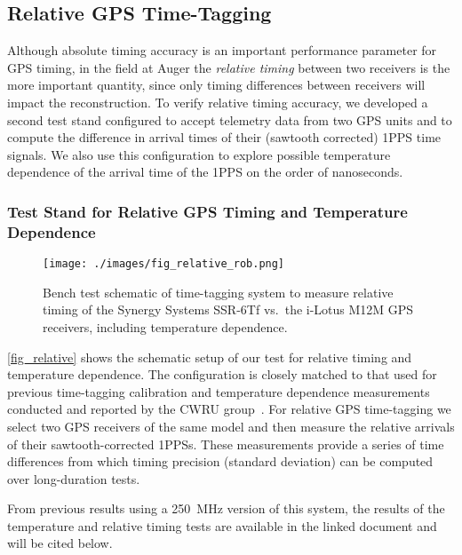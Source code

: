 \subsection{Relative GPS Time-Tagging}

Although absolute timing accuracy is an important performance
parameter for GPS timing, in the field at Auger the {\em
  relative timing} between two receivers is the more important
quantity, since only timing differences between receivers will impact
the reconstruction.  To verify relative timing accuracy, we developed
a second test stand configured to accept telemetry data from two GPS
units and to compute the difference in arrival times of their
(sawtooth corrected) 1PPS time signals. We also use this configuration
to explore possible temperature dependence of the arrival time of the
1PPS on the order of nanoseconds. 


\subsubsection{Test Stand for Relative GPS Timing and Temperature Dependence} 


\begin{figure}[H]
\centering
\texttt{[image: ./images/fig\_relative\_rob.png]}
\caption[Relative Timing Test Diagram]{Bench test schematic of time-tagging system to measure relative timing of the Synergy Systems SSR-6Tf vs.~the i-Lotus M12M GPS receivers, including temperature dependence.}
\label{fig_relative}
\end{figure}

\autoref{fig_relative} shows the schematic setup of our test
for relative timing and temperature dependence.  The configuration is
closely matched to that used for previous time-tagging calibration and
temperature dependence measurements conducted and reported by the
CWRU group~\cite{brandt}. For relative GPS time-tagging we select two GPS
receivers of the same model and then measure the relative arrivals of their sawtooth-corrected 1PPSs. These measurements provide a series of time differences from which timing precision (standard deviation) can be computed over long-duration tests.

From previous results using a 250~MHz version of this system, the
results of the temperature and relative timing tests are available in
the linked document and will be cited below. 


